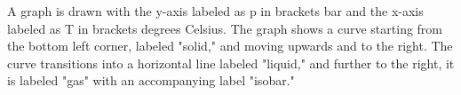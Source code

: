 A graph is drawn with the y-axis labeled as p in brackets bar and the x-axis labeled as T in brackets degrees Celsius. The graph shows a curve starting from the bottom left corner, labeled "solid," and moving upwards and to the right. The curve transitions into a horizontal line labeled "liquid," and further to the right, it is labeled "gas" with an accompanying label "isobar."